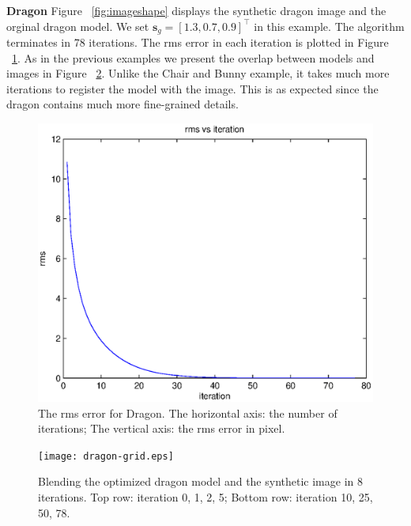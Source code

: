 \documentclass[10pt,twocolumn,letterpaper]{article}
\begin{document}
\noindent
\textbf{Dragon} Figure ~\ref{fig:imageshape} displays the synthetic dragon image and the orginal dragon model. We set $\mathbf{s}_g=[1.3, 0.7, 0.9]^\top$ in this example. The algorithm terminates in 78 iterations. The rms error in each iteration is plotted in Figure ~\ref{fig:dragonplot}. As in the previous examples we present the overlap between models and images in Figure ~\ref{fig:dragongrid}. Unlike the Chair and Bunny example, it takes much more iterations to register the model with the image. This is as expected since the dragon contains much more fine-grained details.

\begin{figure}[t]
\begin{center}
	\includegraphics[scale=0.55]{dragon-figure.eps}
\end{center}
	\caption{The rms error for Dragon. The horizontal axis: the number of iterations; The vertical axis: the rms error in pixel.}
\label{fig:dragonplot}
\end{figure}

\begin{figure}
\begin{center}
	\texttt{[image: dragon-grid.eps]}
\end{center}
   \caption{Blending the optimized dragon model and the synthetic image in 8 iterations. Top row: iteration 0, 1, 2, 5; Bottom row: iteration 10, 25, 50, 78.}
\label{fig:dragongrid}
\end{figure}

\end{document}
